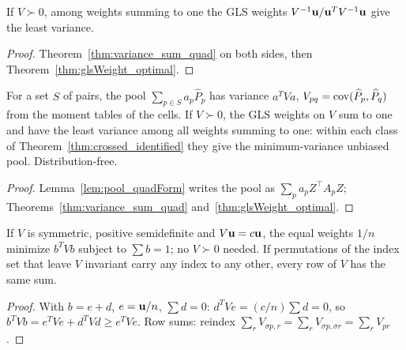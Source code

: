 \begin{theorem}\label{thm:quadPool_gls_optimal}
  \leanok
  If $V \succ 0$, among weights summing to one the GLS weights $V^{-1}\mathbf{u}/\mathbf{u}^TV^{-1}\mathbf{u}$ give
  the least variance.
\end{theorem}
\begin{proof}
  \leanok
  Theorem~\ref{thm:variance_sum_quad} on both sides, then Theorem~\ref{thm:glsWeight_optimal}.
\end{proof}

\begin{theorem}\label{thm:pairPool_gls}
  \leanok
  For a set $S$ of pairs, the pool $\sum_{p \in S} a_p\widehat P_p$ has variance $a^TVa$,
  $V_{pq} = \operatorname{cov}(\widehat P_p, \widehat P_q)$ from the moment tables of the cells. If $V \succ 0$,
  the GLS weights on $V$ sum to one and have the least variance among all weights summing to one:
  within each class of Theorem~\ref{thm:crossed_identified} they give the minimum-variance unbiased
  pool. Distribution-free.
\end{theorem}
\begin{proof}
  \leanok
  Lemma~\ref{lem:pool_quadForm} writes the pool as $\sum_p a_pZ^\top A_pZ$;
  Theorems~\ref{thm:variance_sum_quad} and~\ref{thm:glsWeight_optimal}.
\end{proof}

\begin{theorem}\label{thm:equalWeight_optimal}
  \leanok
  If $V$ is symmetric, positive semidefinite and $V\mathbf{u} = c\mathbf{u}$, the equal weights $1/n$ minimize
  $b^TVb$ subject to $\sum b = 1$; no $V \succ 0$ needed. If permutations of the index set that
  leave $V$ invariant carry any index to any other, every row of $V$ has the same sum.
\end{theorem}
\begin{proof}
  \leanok
  With $b = e + d$, $e = \mathbf{u}/n$, $\sum d = 0$: $d^TVe = (c/n)\sum d = 0$, so
  $b^TVb = e^TVe + d^TVd \ge e^TVe$. Row sums: reindex $\sum_r V_{\sigma p, r} = \sum_r
  V_{\sigma p, \sigma r} = \sum_r V_{pr}$.
\end{proof}

